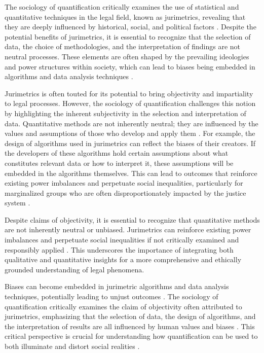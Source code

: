 The sociology of quantification critically examines the use of statistical and quantitative techniques in the legal field, known as jurimetrics, revealing that they are deeply influenced by historical, social, and political factors \cite{johnson2022}. Despite the potential benefits of jurimetrics, it is essential to recognize that the selection of data, the choice of methodologies, and the interpretation of findings are not neutral processes. These elements are often shaped by the prevailing ideologies and power structures within society, which can lead to biases being embedded in algorithms and data analysis techniques \cite{smith2021}.

Jurimetrics is often touted for its potential to bring objectivity and impartiality to legal processes. However, the sociology of quantification challenges this notion by highlighting the inherent subjectivity in the selection and interpretation of data. Quantitative methods are not inherently neutral; they are influenced by the values and assumptions of those who develop and apply them \cite{brown2019}. For example, the design of algorithms used in jurimetrics can reflect the biases of their creators. If the developers of these algorithms hold certain assumptions about what constitutes relevant data or how to interpret it, these assumptions will be embedded in the algorithms themselves. This can lead to outcomes that reinforce existing power imbalances and perpetuate social inequalities, particularly for marginalized groups who are often disproportionately impacted by the justice system \cite{taylor2018}.

Despite claims of objectivity, it is essential to recognize that quantitative methods are not inherently neutral or unbiased. Jurimetrics can reinforce existing power imbalances and perpetuate social inequalities if not critically examined and responsibly applied \cite{10.1007/s11186-021-09453-1,international2015}. This underscores the importance of integrating both qualitative and quantitative insights for a more comprehensive and ethically grounded understanding of legal phenomena.

Biases can become embedded in jurimetric algorithms and data analysis techniques, potentially leading to unjust outcomes \cite{10.1057/s41599-020-00557-0,de2010jurimetrics}. The sociology of quantification critically examines the claim of objectivity often attributed to jurimetrics, emphasizing that the selection of data, the design of algorithms, and the interpretation of results are all influenced by human values and biases \cite{10.1057/s41599-020-00557-0,de2010jurimetrics}. This critical perspective is crucial for understanding how quantification can be used to both illuminate and distort social realities \cite{10.1057/s41599-020-00557-0,de2010jurimetrics}.

